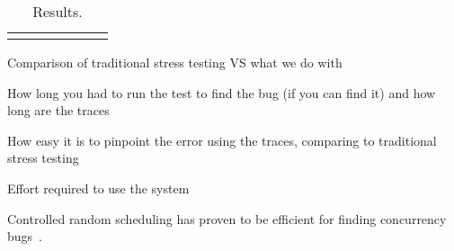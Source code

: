 \setlength{\tabcolsep}{.42em}
\begin{table*}[t]
\small
\centering
\begin{tabular}{l rr rrrr}
\centering

\end{tabular}
\caption{Results.}
\label{tab:testing}
\end{table*}

Comparison of traditional stress testing VS what we do with \psharp

How long you had to run the test to find the bug (if you can find it) and how long are the traces

How easy it is to pinpoint the error using the \psharp traces, comparing to traditional stress testing

Effort required to use the system

Controlled random scheduling has proven to be efficient for finding concurrency bugs~\cite{thomson2014sct, deligiannis2015psharp}.

